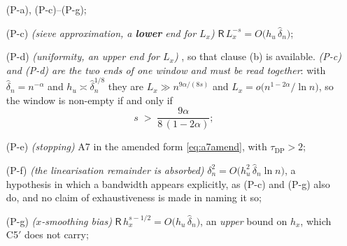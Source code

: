 \begin{proposition}
\begin{enumerate}
\textup{(P-a)}, \textup{(P-c)}--\textup{(P-g)};
\item[(P-c)] \emph{(sieve approximation, a \textbf{lower} end for $L_x$)}
$\mathsf R\,L_x^{-s}=O\big(h_u\,\hat\delta_n\big)$;
\item[(P-d)] \emph{(uniformity, an \emph{upper} end for $L_x$)} , so that
 clause (b) is available. \emph{(P-c) and (P-d) are the two ends of one window
and must be read together}: with $\hat\delta_n=n^{-\alpha}$ and $h_u\asymp\hat\delta_n^{1/8}$ they are
$L_x\gg n^{9\alpha/(8s)}$ and $L_x=o\big(n^{1-2\alpha}/\ln n\big)$, so the window is non-empty if and
only if
\begin{equation}\label{eq:lxwindow}
s\;>\;\frac{9\alpha}{8\,(1-2\alpha)} ;
\end{equation}
\item[(P-e)] \emph{(stopping)} A7 in the amended form \eqref{eq:a7amend}, with
$\tau_{\mathrm{DP}}>2$;
\item[(P-f)] \emph{(the linearisation remainder is absorbed)}
$\delta_n^{2}=O\big(h_u^{2}\,\hat\delta_n\ln n\big)$, a hypothesis in which a bandwidth appears
explicitly, as (P-c) and (P-g) also do, and no claim of exhaustiveness is made in naming it so;
\item[(P-g)] \emph{($x$-smoothing bias)} $\mathsf R\,h_x^{s-1/2}=O\big(h_u\,\hat\delta_n\big)$, an
\emph{upper} bound on $h_x$, which C5$'$ does not carry;

\end{enumerate}
\end{proposition}

